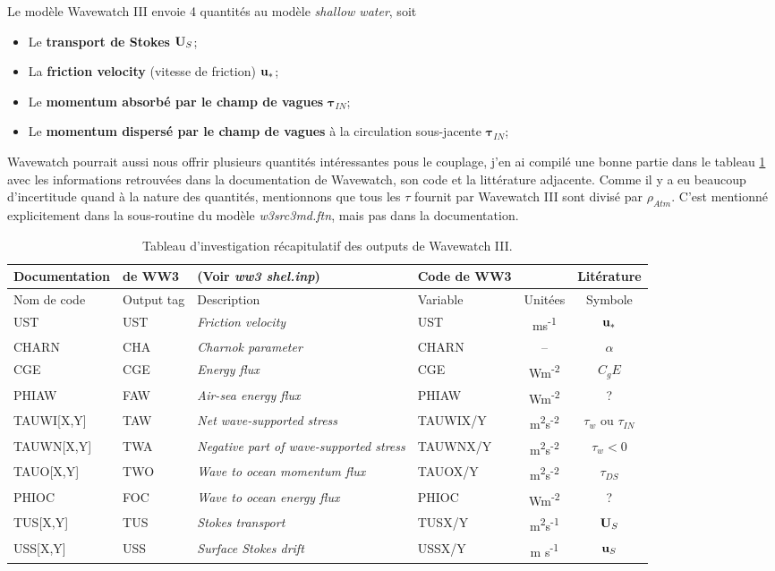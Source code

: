 \documentclass[10pt]{report}
\numberwithin{equation}{section}
\newcommand{\uu}{\vb{u}}
\newcommand{\ust}{\vb{u}_{\ast}}
\begin{document}
Le modèle Wavewatch III envoie 4 quantités au modèle \emph{shallow water}, soit
\begin{itemize}
\item Le \textbf{transport de Stokes} \(\vb{U}_S\);
\item La \textbf{friction velocity} (vitesse de friction) \(\vb{\uu}_*\);
\item Le \textbf{momentum absorbé par le champ de vagues} \(\boldsymbol{\tau}_{IN}\);
\item Le \textbf{momentum dispersé par le champ de vagues} à la circulation sous-jacente \(\boldsymbol{\tau}_{IN}\);\bigskip
\end{itemize}

Wavewatch pourrait aussi nous offrir plusieurs quantités intéressantes pous le couplage, j'en ai compilé une bonne partie dans le tableau \ref{tab:org58849e4} avec les informations retrouvées dans la documentation de Wavewatch, son code et la littérature adjacente.
Comme il y a eu beaucoup d'incertitude quand à la nature des quantités, mentionnons que tous les \(\tau\) fournit par Wavewatch III sont divisé par \(\rho_{Atm}\).
C'est mentionné explicitement dans la sous-routine du modèle \emph{w3src3md.ftn}, mais pas dans la documentation.

\begin{table}[htbp]
\caption{\label{tab:org58849e4}Tableau d'investigation récapitulatif des outputs de Wavewatch III.}
\centering
\begin{tabular}{lll|lc|c}
\hline
\hline
\textbf{Documentation} & \textbf{de WW3} & (Voir \emph{ww3 shel.inp}) & \textbf{Code de WW3} &  & \textbf{Litérature}\\
\hline
Nom de code & Output tag & Description & Variable & Unitées & Symbole\\
\hline
UST & UST & \emph{Friction velocity} & UST & ms\textsuperscript{-1} & \(\ust\)\\
CHARN & CHA & \emph{Charnok parameter} & CHARN & -- & \(\alpha\)\\
CGE & CGE & \emph{Energy flux} & CGE & Wm\textsuperscript{-2} & \(C_gE\)\\
PHIAW & FAW & \emph{Air-sea energy flux} & PHIAW & Wm\textsuperscript{-2} & ?\\
TAUWI[X,Y] & TAW & \emph{Net wave-supported stress} & TAUWIX/Y & m\textsuperscript{2}s\textsuperscript{-2} & \(\tau_w\)  ou \(\tau_{IN}\)\\
TAUWN[X,Y] & TWA & \emph{Negative part of wave-supported stress} & TAUWNX/Y & m\textsuperscript{2}s\textsuperscript{-2} & \(\tau_w<0\)\\
\hline
TAUO[X,Y] & TWO & \emph{Wave to ocean momentum flux} & TAUOX/Y & m\textsuperscript{2}s\textsuperscript{-2} & \(\tau_{DS}\)\\
PHIOC & FOC & \emph{Wave to ocean energy flux} & PHIOC & Wm\textsuperscript{-2} & ?\\
TUS[X,Y] & TUS & \emph{Stokes transport} & TUSX/Y & m\textsuperscript{2}s\textsuperscript{-1} & \(\vb{U}_S\)\\
USS[X,Y] & USS & \emph{Surface Stokes drift} & USSX/Y & m s\textsuperscript{-1} & \(\uu_S\)\\
\hline
\hline
\end{tabular}
\end{table}
\end{document}
